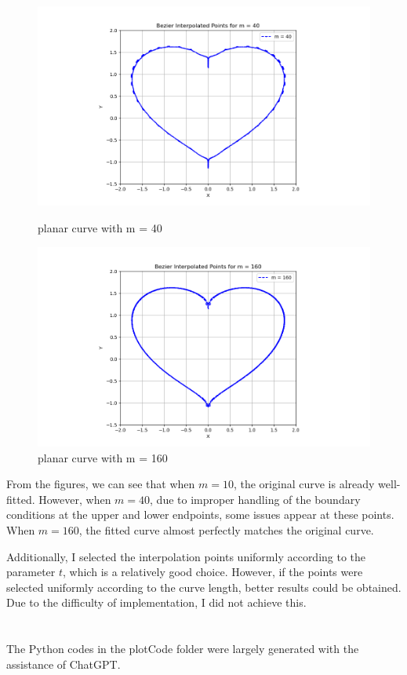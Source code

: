 \documentclass[a4paper]{article}
\begin{document}
\begin{figure}[ht]
\begin{minipage}[b]{0.45\textwidth}
    \centering
    \includegraphics[width=\textwidth]{figures/bezier2.png}
    \caption{planar curve with m = 40}
    \label{fig:bezierm40}
  \end{minipage}
  \hfill
  \begin{minipage}[b]{0.45\textwidth}
    \centering
    \includegraphics[width=\textwidth]{figures/bezier3.png}
    \caption{planar curve with m = 160}
    \label{fig:bezierm160}
  \end{minipage}
\end{figure}

From the figures, we can see that when \( m = 10 \), the original curve is already well-fitted. However, when \( m = 40 \), due to improper handling of the boundary conditions at the upper and lower endpoints, some issues appear at these points. When \( m = 160 \), the fitted curve almost perfectly matches the original curve.

Additionally, I selected the interpolation points uniformly according to the parameter \( t \), which is a relatively good choice. However, if the points were selected uniformly according to the curve length, better results could be obtained. Due to the difficulty of implementation, I did not achieve this.
\section*{  }
The Python codes in the plotCode folder were largely generated with the assistance of ChatGPT.
\end{document}
